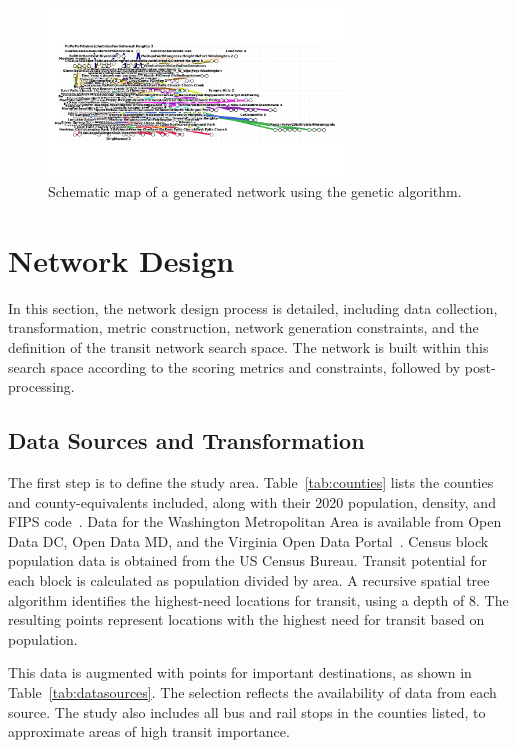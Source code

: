 \documentclass[manuscript]{acmart}
\begin{document}
\begin{figure}[h]
    \centering
    \includegraphics[width=0.7\textwidth]{img/lines_genetic.png}
    \caption{Schematic map of a generated network using the genetic algorithm.}
    \label{fig:schematic}
\end{figure}

\section{Network Design}

In this section, the network design process is detailed, including data collection, transformation, metric construction, network generation constraints, and the definition of the transit network search space. The network is built within this search space according to the scoring metrics and constraints, followed by post-processing.

\subsection{Data Sources and Transformation}
The first step is to define the study area. Table~\ref{tab:counties} lists the counties and county-equivalents included, along with their 2020 population, density, and FIPS code~\cite{lit:census}. Data for the Washington Metropolitan Area is available from Open Data DC, Open Data MD, and the Virginia Open Data Portal~\cite{lit:opendata}. Census block population data is obtained from the US Census Bureau. Transit potential for each block is calculated as population divided by area. A recursive spatial tree algorithm identifies the highest-need locations for transit, using a depth of 8. The resulting points represent locations with the highest need for transit based on population.

This data is augmented with points for important destinations, as shown in Table~\ref{tab:datasources}. The selection reflects the availability of data from each source. The study also includes all bus and rail stops in the counties listed, to approximate areas of high transit importance.
\end{document}

